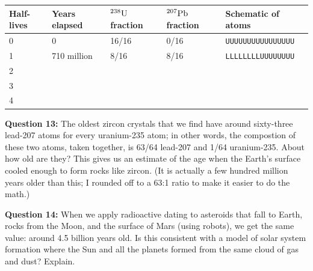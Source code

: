 \documentclass[11pt]{article}
\begin{document}
\Large
\begin{tabular}{|l|l|l|l|l|}
\hline
Half-lives & Years elapsed & ${}^{238}\rm U$ fraction & ${}^{207}\rm Pb$ fraction & Schematic of atoms                          \\ \hline
0                                   & 0                              & 16/16                                            & 0/16                                          & {\tt UUUUUUUUUUUUUUUU} \\\hline
1                                   & 710 million                    & 8/16                                             & 8/16                                          & {\tt LLLLLLLLUUUUUUUU} \\\hline
2                                   &                                &                                                  &                                               &                                             \\\hline
3                                   &                                &                                                  &                                               &                                             \\\hline
4                                   &                                &                                                  &                                               &                                             \\\hline
\end{tabular}

\normalsize\vspace{1.5in}

{\bf Question 13:} The oldest zircon crystals that we find have around sixty-three lead-207 atoms for every uranium-235 atom; in other words, the
compostion of these two atoms, taken together, is 63/64 lead-207 and 1/64 uranium-235.
 About how old are they? This gives us an estimate of the age when the Earth's surface cooled enough to form rocks like 
zircon. (It is actually a few hundred million years older than this; I rounded off to a 63:1 ratio to make it easier to do the math.)

\vspace{1.2in}

{\bf Question 14:} When we apply radioactive dating to asteroids that fall to Earth, rocks from the Moon, and the surface of Mars (using robots), we get the same value: around 4.5 billion years old. Is this consistent with a model of solar system formation where the Sun and all the planets formed from the same cloud of gas and dust? Explain.
\end{document}
